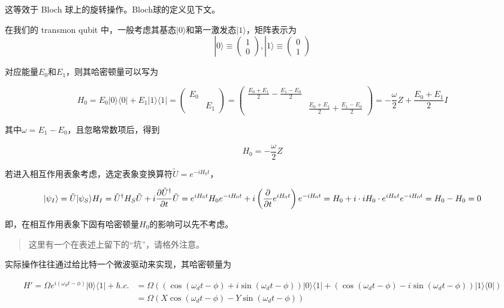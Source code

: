 \documentclass[11pt]{article}
\begin{document}
这等效于 Bloch 球上的旋转操作。Bloch球的定义见下文。

在我们的 transmon qubit
中，一般考虑其基态\(|0\rangle\)和第一激发态\(|1\rangle\)，矩阵表示为 \[
|0\rangle\equiv\begin{pmatrix}1\\0\end{pmatrix}, |1\rangle\equiv\begin{pmatrix}0\\1\end{pmatrix}
\]

对应能量\(E_0\)和\(E_1\)，则其哈密顿量可以写为

\[
H_0=E_0|0\rangle\langle0|+E_1|1\rangle\langle1|=\begin{pmatrix}E_0&\\&E_1\end{pmatrix}=\begin{pmatrix}\frac{E_0+E_1}2-\frac{E_1-E_0}2&\\&\frac{E_0+E_1}2+\frac{E_1-E_0}2\end{pmatrix}=-\frac\omega2Z+\frac{E_0+E_1}2I
\]

其中\(\omega=E_1-E_0\)，且忽略常数项后，得到

\[
H_0=-\frac\omega2Z
\]

若进入相互作用表象考虑，选定表象变换算符\(\tilde U=e^{-iH_0t}\)，

\[
|\psi_I\rangle=\tilde U|\psi_S\rangle\\
H_I=\tilde U^\dagger H_S\tilde U+i\frac{\partial \tilde U^\dagger}{\partial t}\tilde U=e^{iH_0t}H_0e^{-iH_0t}+i\left(\frac{\partial }{\partial t}e^{iH_0t}\right)e^{-iH_0t}=H_0+i\cdot iH_0\cdot e^{iH_0t}e^{-iH_0t}=H_0-H_0=0
\]

即，在相互作用表象下固有哈密顿量\(H_0\)的影响可以先不考虑。

\begin{quote}
这里有一个在表述上留下的``坑''，请格外注意。
\end{quote}

实际操作往往通过给比特一个微波驱动来实现，其哈密顿量为

\[
\begin{aligned}
H'=\Omega e^{i(\omega_dt-\phi)}|0\rangle\langle1|+h.c.
&=\Omega\left(\left(\cos{(\omega_dt-\phi)}+i\sin{(\omega_dt-\phi)}\right)|0\rangle\langle1|+\left(\cos{(\omega_dt-\phi)}-i\sin{(\omega_dt-\phi)}\right)|1\rangle\langle0|\right)\\
&=\Omega\left(X\cos{(\omega_dt-\phi)}-Y\sin{(\omega_dt-\phi)}\right)
\end{aligned}
\]
\end{document}
